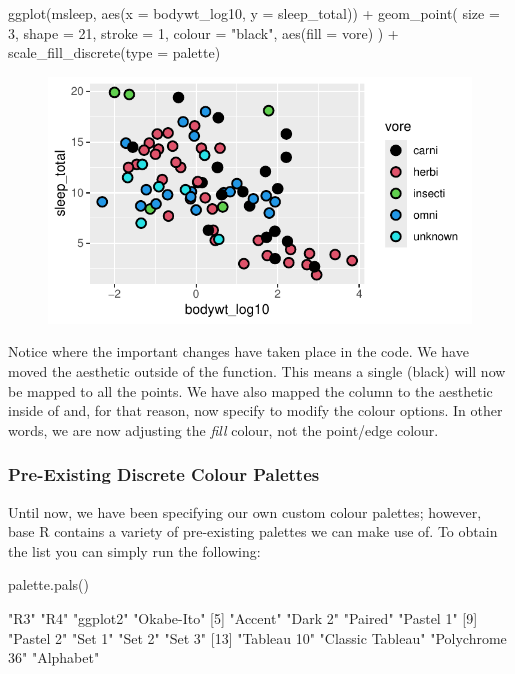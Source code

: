 \begin{inR}
ggplot(msleep, aes(x = bodywt_log10, y = sleep_total)) +
  geom_point(
    size = 3, shape = 21, stroke = 1, colour = "black",
    aes(fill = vore)
  ) +
  scale_fill_discrete(type = palette)
\end{inR}

\vspace{2em}

\begin{figure}[H]
\includegraphics[scale = .75]{graphics/ch2Figs/ggEx_24.pdf}
\end{figure}

\noindent
Notice where the important changes have taken place in the code.  We have moved the  aesthetic outside of the  function.  This means a single  (black) will now be mapped to all the points. We have also mapped the  column to the  aesthetic inside of  and, for that reason, now specify  to modify the colour options. In other words, we are now adjusting the \textit{fill} colour, not the point/edge colour.

\subsubsection{Pre-Existing Discrete Colour Palettes}

Until now, we have been specifying our own custom colour palettes; however, base R contains a variety of pre-existing palettes we can make use of. To obtain the list you can simply run the following:

\begin{inR}
palette.pals()
\end{inR}
\begin{outR}
 [1] "R3"              "R4"              "ggplot2"         "Okabe-Ito"      
 [5] "Accent"          "Dark 2"          "Paired"          "Pastel 1"       
 [9] "Pastel 2"        "Set 1"           "Set 2"           "Set 3"          
[13] "Tableau 10"      "Classic Tableau" "Polychrome 36"   "Alphabet"
\end{outR}

